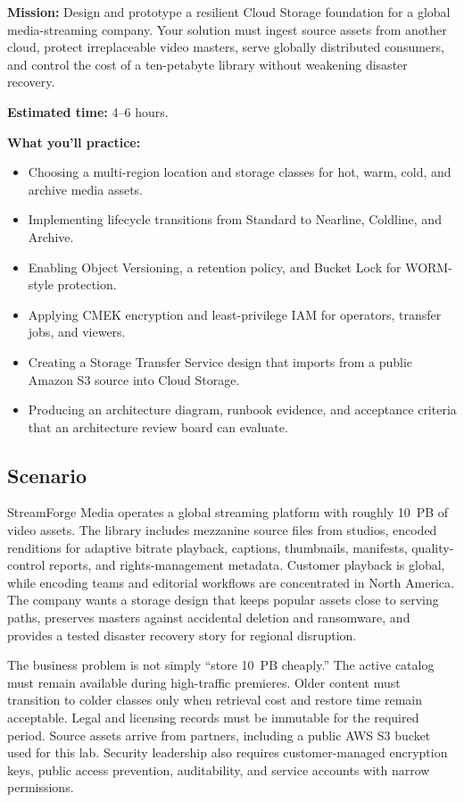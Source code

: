 \begin{capstonebox}
\textbf{Mission:} Design and prototype a resilient Cloud Storage foundation for a global media-streaming company. Your solution must ingest source assets from another cloud, protect irreplaceable video masters, serve globally distributed consumers, and control the cost of a ten-petabyte library without weakening disaster recovery.

\textbf{Estimated time:} 4--6 hours.

\textbf{What you'll practice:}
\begin{itemize}
    \item Choosing a multi-region location and storage classes for hot, warm, cold, and archive media assets.
    \item Implementing lifecycle transitions from Standard to Nearline, Coldline, and Archive.
    \item Enabling Object Versioning, a retention policy, and Bucket Lock for WORM-style protection.
    \item Applying CMEK encryption and least-privilege IAM for operators, transfer jobs, and viewers.
    \item Creating a Storage Transfer Service design that imports from a public Amazon S3 source into Cloud Storage.
    \item Producing an architecture diagram, runbook evidence, and acceptance criteria that an architecture review board can evaluate.
\end{itemize}
\end{capstonebox}

\subsection*{Scenario}
StreamForge Media operates a global streaming platform with roughly 10~PB of video assets. The library includes mezzanine source files from studios, encoded renditions for adaptive bitrate playback, captions, thumbnails, manifests, quality-control reports, and rights-management metadata. Customer playback is global, while encoding teams and editorial workflows are concentrated in North America. The company wants a storage design that keeps popular assets close to serving paths, preserves masters against accidental deletion and ransomware, and provides a tested disaster recovery story for regional disruption.

The business problem is not simply ``store 10~PB cheaply.'' The active catalog must remain available during high-traffic premieres. Older content must transition to colder classes only when retrieval cost and restore time remain acceptable. Legal and licensing records must be immutable for the required period. Source assets arrive from partners, including a public AWS S3 bucket used for this lab. Security leadership also requires customer-managed encryption keys, public access prevention, auditability, and service accounts with narrow permissions.

